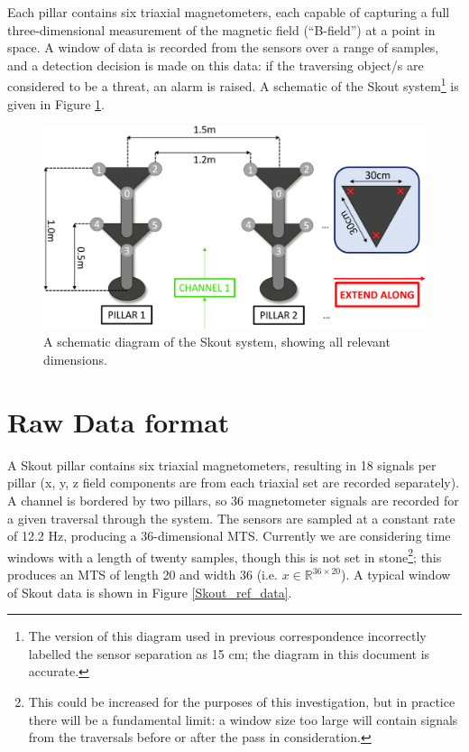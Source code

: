 \documentclass[10pt, a4paper, twocolumn]{article} %
\begin{document}
Each pillar contains six triaxial magnetometers, each capable of capturing a full three-dimensional measurement of the magnetic field (“B-field”) at a point in space. A window of data is recorded from the sensors over a range of samples, and a detection decision is made on this data: if the traversing object/s are considered to be a threat, an alarm is raised. A schematic of the Skout system\footnote{The version of this diagram used in previous correspondence incorrectly labelled the sensor separation as 15 cm; the diagram in this document is accurate.} is given in Figure \ref{Skout_schematic}.

\begin{figure}
	\includegraphics[width=\linewidth]{Figures/Fixed_Skout_Schematic.png} %
	\caption{A schematic diagram of the Skout system, showing all relevant dimensions.}
	\label{Skout_schematic}
\end{figure}


\section{Raw Data format}

A Skout pillar contains six triaxial magnetometers, resulting in 18 signals per pillar (x, y, z field components are from each triaxial set are recorded separately). A channel is bordered by two pillars, so 36 magnetometer signals are recorded for a given traversal through the system. The sensors are sampled at a constant rate of 12.2 Hz, producing a 36-dimensional MTS. Currently we are considering time windows with a length of twenty samples, though this is not set in stone\footnote{This could be increased for the purposes of this investigation, but in practice there will be a fundamental limit: a window size too large will contain signals from the traversals before or after the pass in consideration.}; this produces an MTS of length 20 and width 36 (i.e. $x \in \mathbb{R}^{36\times20}$). A typical window of Skout data is shown in Figure \ref{Skout_ref_data}.
\end{document}
